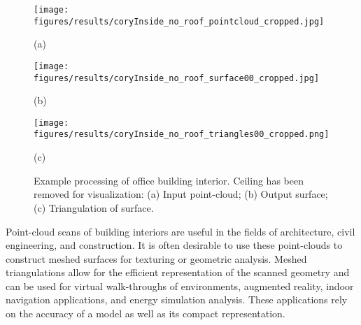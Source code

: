 \documentclass[10pt,twocolumn,letterpaper]{article}
\begin{document}
\begin{figure*}[t]


	\begin{minipage}[b]{0.3\linewidth}
	\centerline{\texttt{[image: figures/results/coryInside\_no\_roof\_pointcloud\_cropped.jpg]}}
	\centerline{(a)}\medskip
	\end{minipage}
	\hfill
	\begin{minipage}[b]{0.3\linewidth}
	\centerline{\texttt{[image: figures/results/coryInside\_no\_roof\_surface00\_cropped.jpg]}}
	\centerline{(b)}\medskip
	\end{minipage}
	\hfill
	\begin{minipage}[b]{0.3\linewidth}
	\centerline{\texttt{[image: figures/results/coryInside\_no\_roof\_triangles00\_cropped.png]}}
	\centerline{(c)}\medskip
	\end{minipage}

\caption{Example processing of office building interior.  Ceiling has been removed for visualization:  (a) Input point-cloud; (b) Output surface; (c) Triangulation of surface.}
\label{fig:mydesk}
\end{figure*}

Point-cloud scans of building interiors are useful in the fields of architecture, civil engineering, and construction.  It is often desirable to use these point-clouds to construct meshed surfaces for texturing or geometric analysis.  Meshed triangulations allow for the efficient representation of the scanned geometry and can be used for virtual walk-throughs of environments, augmented reality, indoor navigation applications, and energy simulation analysis.  These applications rely on the accuracy of a model as well as its compact representation.
\end{document}
